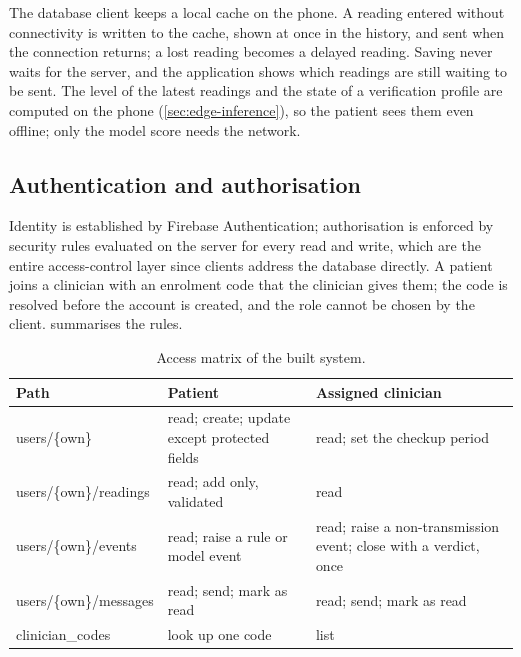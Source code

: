 The database client keeps a local cache on the phone. A reading entered without connectivity is written to the cache, shown at once in the history, and sent when the connection returns; a lost reading becomes a delayed reading. Saving never waits for the server, and the application shows which readings are still waiting to be sent. The level of the latest readings and the state of a verification profile are computed on the phone (\cref{sec:edge-inference}), so the patient sees them even offline; only the model score needs the network.

\subsection{Authentication and authorisation}\label{sec:auth}\label{sec:roles}\label{sec:rules}\label{sec:write-validation}

Identity is established by Firebase Authentication; authorisation is enforced by security rules evaluated on the server for every read and write, which are the entire access-control layer since clients address the database directly. A patient joins a clinician with an enrolment code that the clinician gives them; the code is resolved before the account is created, and the role cannot be chosen by the client.  summarises the rules.

\begin{table}[htbp]
\centering\footnotesize
\caption{Access matrix of the built system.}\label{tab:access-matrix}
\begin{tabularx}{\textwidth}{@{}>{\raggedright\arraybackslash\ttfamily\scriptsize}p{3.6cm} >{\raggedright\arraybackslash}X >{\raggedright\arraybackslash}X@{}}
\toprule
\normalfont\textbf{Path} & \textbf{Patient} & \textbf{Assigned clinician} \\
\midrule
users/\{own\} & read; create; update except protected fields & read; set the checkup period \\
users/\{own\}/readings & read; add only, validated & read \\
users/\{own\}/events & read; raise a rule or model event & read; raise a non-transmission event; close with a verdict, once \\
users/\{own\}/messages & read; send; mark as read & read; send; mark as read \\
clinician\_codes & look up one code & list \\
\bottomrule
\end{tabularx}
\end{table}


